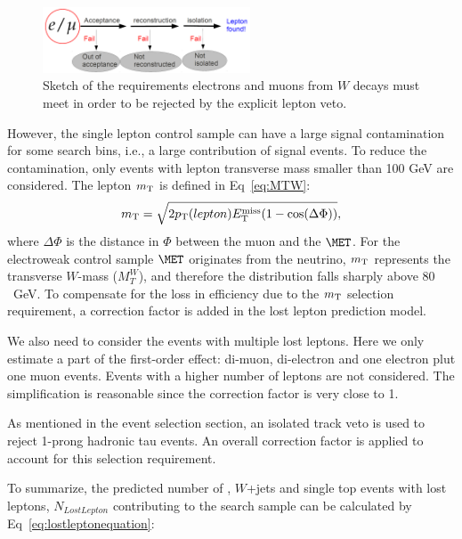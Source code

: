 \begin{figure}[htbp]
\begin{center}
\includegraphics[width=0.55\textwidth]{sections/mc4/Backgrounds/LostLepton/figures/lepton_veto_sketch.png}
\end{center}
\caption{Sketch of the requirements electrons and muons from $W$ decays must meet in order to be rejected by the explicit lepton veto.}
\label{fig:llmethod}
\end{figure}

However, the single lepton control sample can have a large signal contamination for some search bins, i.e., a large contribution of signal events. To reduce the contamination, only events with lepton transverse mass smaller than 100 GeV are considered. The lepton $m_{\rm T}$ is defined in Eq~\ref{eq:MTW}:
\begin{equation}
m_{\rm T} = \sqrt{2 p_{\rm T}(lepton) E^{\rm miss}_{\rm T} (1 - \cos(\Delta \Phi))},
\label{eq:MTW}
\end{equation}
where $\Delta \Phi$ is the distance in $\Phi$ between the muon and the $\MET$. For the electroweak control sample $\MET$ originates from the neutrino, $m_{\rm T}$ represents the transverse $W$-mass ($M_{T}^{W}$), and therefore the distribution falls sharply above $80$~GeV. To compensate for the loss in efficiency due to the $m_{\rm T}$ selection requirement, a correction factor is added in the lost lepton prediction model. 

We also need to consider the events with multiple lost leptons. Here we only estimate a part of the first-order effect: di-muon, di-electron and one electron plut one muon events. Events with a higher number of leptons are not considered. The simplification is reasonable since the correction factor is very close to 1.

As mentioned in the event selection section, an isolated track veto is used to reject 1-prong hadronic tau events. An overall correction factor is applied to account for this selection requirement. 

To summarize, the predicted number of \ttbar, $W$+jets and single top events with lost leptons, $N_{LostLepton}$ contributing to the search sample can be calculated by Eq~\ref{eq:lostleptonequation}:

